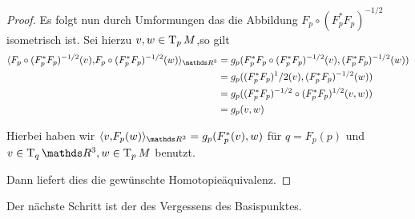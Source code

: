 \begin{Satz}
\begin{proof}
          Es folgt nun durch Umformungen das die Abbildung
          $ F_p \circ (F_p^\ast F_p)^{-1/2} $ isometrisch
          ist. Sei hierzu $ v,w \in \operatorname{T}_{p}M $,so gilt
          \begin{align*}
            \scalar{F_p \circ (F_p^\ast F_p)^{-1/2}(v)}{F_p \circ (F_p^\ast F_p)^{-1/2}(w)}_{\R^3} &=
                                                                                                                     g_p(F_p^\ast F_p \circ (F_p^\ast F_p)^{-1/2}(v),(F_p^\ast F_p)^{-1/2}(w)) \\
                                                                                                                   &= g_p((F_p^\ast F_p)^1/2(v),(F_p^\ast F_p)^{-1/2}(w)) \\
                                                                                                                   &= g_p((F_p^\ast F_p)^{-1/2} \circ (F_p^\ast F_p)^{1/2}(v,w)) \\
                                                                                                                   &= g_p(v,w)
		\end{align*}
		
		Hierbei haben wir $ \scalar{v}{F_p(w)}_{\R^3} = g_p(F_p^\ast(v),w) $ für $ q =F_p(p) $ und $ v \in \tang{q}{\R^3},w\in \tang{p}{M} $ 
		benutzt.
		
		Dann liefert dies die gewünschte Homotopieäquivalenz.
	
	\end{proof}
\end{Satz}

Der nächste Schritt ist der des Vergessens des Basispunktes.

